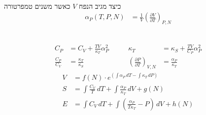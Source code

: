 \begin{cheatformula}\\
כיצד מגיב הנפח $V$ כאשר משנים טמפרטורה
    \begin{align*}
        \alpha_P\left(T,P,N\right) &= \frac{1}{V} \left( \frac{\partial V}{\partial T} \right)_{P,N}
    \end{align*}
\end{cheatformula}

\begin{cheatformula}\\
\[
\begin{aligned}
C_P &= C_V + \frac{TV}{\kappa_T} \alpha_P^2 \quad\quad &
\kappa_T &= \kappa_S + \frac{TV}{C_P} \alpha_P^2 \\[1em]
\frac{C_P}{C_V} &= \frac{\kappa_T}{\kappa_S} \quad\quad &
\left( \frac{\partial P}{\partial T} \right)_{V,N} &= \frac{\alpha_P}{\kappa_T}
\end{aligned}
\]
\begin{align*}
V &= f(N) \cdot e^{\left( \int \alpha_P \, dT - \int \kappa_T \, dP \right)} \\
S &= \int \frac{C_V}{T} \, dT + \int \frac{ \alpha_P }{ \kappa_T } \, dV + g(N) \\
E &= \int C_V \, dT + \int \left( \frac{ \alpha_P }{ T \kappa_T } - P \right) \, dV + h(N)    
\end{align*}
\end{cheatformula}
